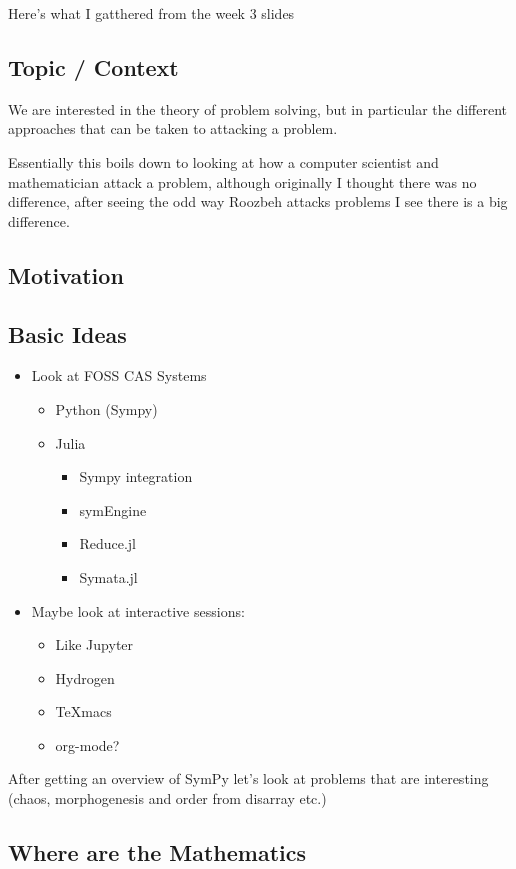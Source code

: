 \documentclass[11pt]{article}
\begin{document}
Here's what I gatthered from the week 3 slides

\subsection{Topic / Context}
\label{sec:org7863535}
We are interested in the theory of problem solving, but in particular the
different approaches that can be taken to attacking a problem.

Essentially this boils down to looking at how a computer scientist and
mathematician attack a problem, although originally I thought there was no
difference, after seeing the odd way Roozbeh attacks problems I see there is a big difference.
\subsection{Motivation}
\label{sec:org01f7be3}

\subsection{Basic Ideas}
\label{sec:org25b65d1}
\begin{itemize}
\item Look at FOSS CAS Systems
\begin{itemize}
\item Python (Sympy)
\item Julia
\begin{itemize}
\item Sympy integration
\item symEngine
\item Reduce.jl
\item Symata.jl
\end{itemize}
\end{itemize}

\item Maybe look at interactive sessions:
\begin{itemize}
\item Like Jupyter
\item Hydrogen
\item TeXmacs
\item org-mode?
\end{itemize}
\end{itemize}

After getting an overview of SymPy let's look at problems that are interesting (chaos, morphogenesis and order from disarray etc.)

\subsection{Where are the Mathematics}
\label{sec:orgb45c7d7}
\end{document}
